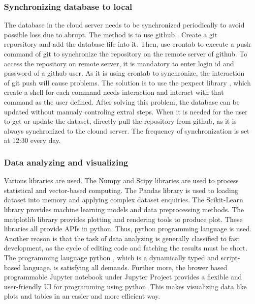 \documentclass[12pt,a4paper]{report}
\begin{document}
                \subsubsection{Synchronizing database to local} 
                The database in the cloud server needs to be synchronized periodically to avoid possible loss due to abrupt. The method is to use github \cite{website:github}. Create a git reporsitory \cite{website:git}
                and add the database file into it. Then, use crontab to execute a push command of git to synchronize the repository on the remote server of github. To access the repository on remote server, it is mandatory
                to enter login id and password of a github user. As it is using crontab to synchronize, the interaction of git push will cause problems. The solution is to use the pexpect library \cite{website:pexpect}, which
                create a shell for each command needs interaction and interact with that command as the user defined. After solving this problem, the database can be updated without manualy controling extral steps. When it is
                needed for the user to get or update the dataset, directly pull the repository from github, as it is always synchronized to the clound server. The frequency of synchronization is set at 12:30 every day.

                \subsubsection{Data analyzing and visualizing}
                Various libraries are used. The Numpy and Scipy libraries \cite{website:numpy} \cite{website:scipy} are used to process statistical and vector-based computing. The Pandas library \cite{website:pandas} is used
                to loading dataset into memory and applying complex dataset enquiries. The Scikit-Learn library \cite{website:scikit} provides machine learning models and data preprocessing methods. The matplotlib library
                \cite{website:matplotlib} provides plotting and rendering tools to produce plot. These libraries all provide APIs in python. Thus, python programming language \cite{website:python3} is used. Another reason is that
                the task of data analyzing is generally classified to fast development, as the cycle of editing code and fatching the results must be short. The programming lauguage python \cite{website:python3}, which is a
                dynamically typed and script-based language, is satisfying all demands. Further more, the brower based programmable Jupyter notebook under Jupyter Project \cite{website:jupyter} provides a flexible and user-friendly
                UI for programming using python. This makes visualizing data like plots and tables in an easier and more efficient way.
                
\end{document}
